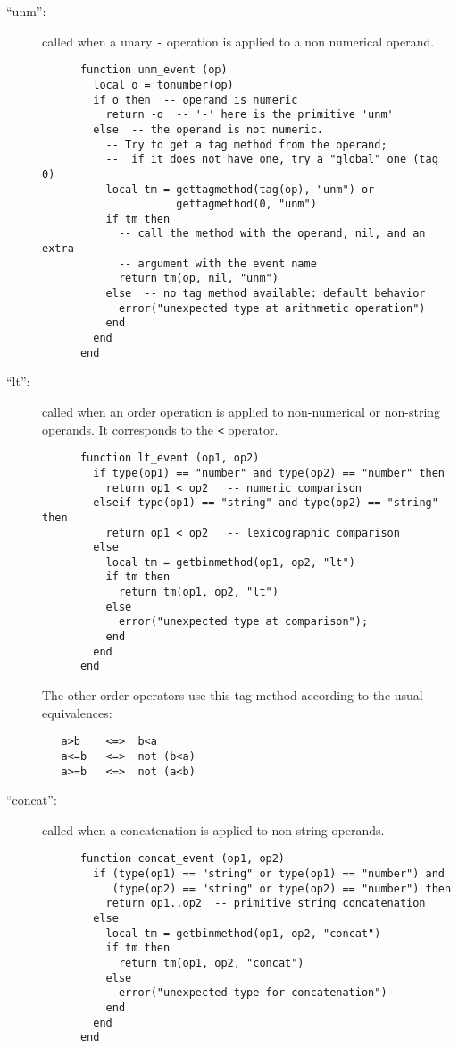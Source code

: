 \documentclass[11pt]{article}
\begin{document}
\begin{description}
\item[``unm'':]
called when a unary \verb|-| operation is applied to a non numerical operand.
\begin{verbatim}
      function unm_event (op)
        local o = tonumber(op)
        if o then  -- operand is numeric
          return -o  -- '-' here is the primitive 'unm'
        else  -- the operand is not numeric.
          -- Try to get a tag method from the operand;
          --  if it does not have one, try a "global" one (tag 0)
          local tm = gettagmethod(tag(op), "unm") or
                     gettagmethod(0, "unm")
          if tm then
            -- call the method with the operand, nil, and an extra
            -- argument with the event name
            return tm(op, nil, "unm")
          else  -- no tag method available: default behavior
            error("unexpected type at arithmetic operation")
          end
        end
      end
\end{verbatim}

\item[``lt'':]
called when an order operation is applied to non-numerical
or non-string operands.
It corresponds to the \verb|<| operator.
\begin{verbatim}
      function lt_event (op1, op2)
        if type(op1) == "number" and type(op2) == "number" then
          return op1 < op2   -- numeric comparison
        elseif type(op1) == "string" and type(op2) == "string" then
          return op1 < op2   -- lexicographic comparison
        else
          local tm = getbinmethod(op1, op2, "lt")
          if tm then
            return tm(op1, op2, "lt")
          else
            error("unexpected type at comparison");
          end
        end
      end
\end{verbatim}
The other order operators use this tag method according to the
usual equivalences:
\begin{verbatim}
   a>b    <=>  b<a
   a<=b   <=>  not (b<a)
   a>=b   <=>  not (a<b)
\end{verbatim}

\item[``concat'':]
called when a concatenation is applied to non string operands.
\begin{verbatim}
      function concat_event (op1, op2)
        if (type(op1) == "string" or type(op1) == "number") and
           (type(op2) == "string" or type(op2) == "number") then
          return op1..op2  -- primitive string concatenation
        else
          local tm = getbinmethod(op1, op2, "concat")
          if tm then
            return tm(op1, op2, "concat")
          else
            error("unexpected type for concatenation")
          end
        end
      end
\end{verbatim}


\end{description}
\end{document}
